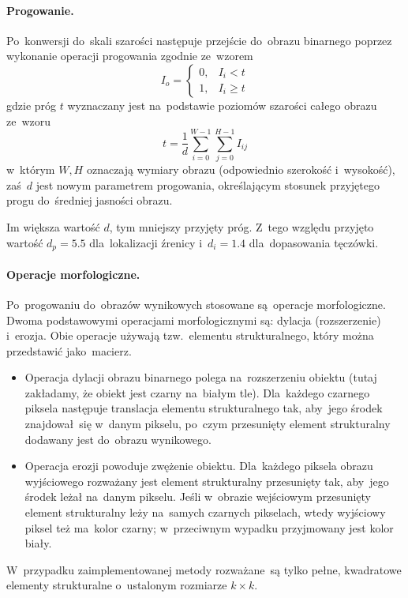 \documentclass[11pt,a4paper]{article}
\begin{document}
\paragraph{Progowanie.}
Po~konwersji do~skali szarości następuje przejście do~obrazu binarnego poprzez wykonanie operacji progowania zgodnie ze~wzorem
$$ I_o = \begin{cases}
    0, & I_i < t \\
    1, & I_i \geq t
\end{cases} $$
gdzie próg $t$ wyznaczany jest na~podstawie poziomów szarości całego obrazu ze~wzoru
$$ t = \frac{1}{d} \sum_{i = 0}^{W - 1} \sum_{j = 0}^{H - 1} I_{ij} $$
w~którym $W, H$ oznaczają wymiary obrazu (odpowiednio szerokość i~wysokość), zaś~$d$ jest nowym parametrem progowania, określającym stosunek przyjętego progu do~średniej jasności obrazu.

Im większa wartość $d$, tym mniejszy przyjęty próg.
Z~tego względu przyjęto wartość $d_p = 5.5$ dla~lokalizacji źrenicy i~$d_i = 1.4$ dla~dopasowania tęczówki.

\paragraph{Operacje morfologiczne.}
Po~progowaniu do~obrazów wynikowych stosowane są~operacje morfologiczne.
Dwoma podstawowymi operacjami morfologicznymi są: dylacja (rozszerzenie) i~erozja.
Obie operacje używają tzw.~elementu strukturalnego, który można przedstawić jako~macierz.
\begin{itemize}
    \item Operacja dylacji obrazu binarnego polega na~rozszerzeniu obiektu (tutaj zakładamy, że obiekt jest czarny na~białym tle).
    Dla~każdego czarnego piksela następuje translacja elementu strukturalnego tak, aby~jego środek znajdował~się w~danym pikselu, po~czym przesunięty element strukturalny dodawany jest do~obrazu wynikowego.
    \item Operacja erozji powoduje zwężenie obiektu.
    Dla~każdego piksela obrazu wyjściowego rozważany jest element strukturalny przesunięty tak, aby~jego środek leżał na~danym pikselu.
    Jeśli w~obrazie wejściowym przesunięty element strukturalny leży na~samych czarnych pikselach, wtedy wyjściowy piksel też ma~kolor czarny; w~przeciwnym wypadku przyjmowany jest kolor biały.
\end{itemize}
W~przypadku zaimplementowanej metody rozważane~są tylko pełne, kwadratowe elementy strukturalne o~ustalonym rozmiarze $k \times k$.
\end{document}
